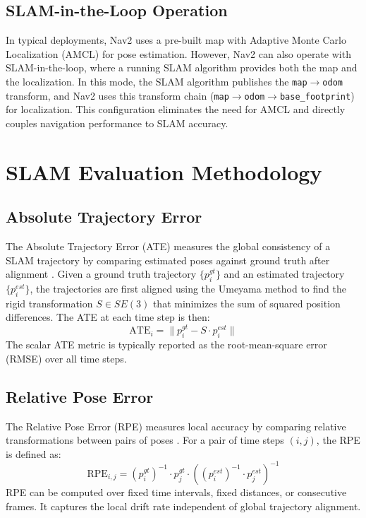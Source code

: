 \subsection{SLAM-in-the-Loop Operation}

In typical deployments, Nav2 uses a pre-built map with Adaptive Monte Carlo Localization (AMCL) for pose estimation. However, Nav2 can also operate with SLAM-in-the-loop, where a running SLAM algorithm provides both the map and the localization. In this mode, the SLAM algorithm publishes the \texttt{map}$\rightarrow$\texttt{odom} transform, and Nav2 uses this transform chain (\texttt{map}$\rightarrow$\texttt{odom}$\rightarrow$\texttt{base\_footprint}) for localization. This configuration eliminates the need for AMCL and directly couples navigation performance to SLAM accuracy.

\section{SLAM Evaluation Methodology}

\subsection{Absolute Trajectory Error}

The Absolute Trajectory Error (ATE) measures the global consistency of a SLAM trajectory by comparing estimated poses against ground truth after alignment \citep{sturm2012benchmark}. Given a ground truth trajectory $\{p_i^{gt}\}$ and an estimated trajectory $\{p_i^{est}\}$, the trajectories are first aligned using the Umeyama method \citep{umeyama1991} to find the rigid transformation $S \in SE(3)$ that minimizes the sum of squared position differences. The ATE at each time step is then:
\begin{equation}
\text{ATE}_i = \| p_i^{gt} - S \cdot p_i^{est} \|
\end{equation}
The scalar ATE metric is typically reported as the root-mean-square error (RMSE) over all time steps.

\subsection{Relative Pose Error}

The Relative Pose Error (RPE) measures local accuracy by comparing relative transformations between pairs of poses \citep{sturm2012benchmark, zhang2018tutorial}. For a pair of time steps $(i, j)$, the RPE is defined as:
\begin{equation}
\text{RPE}_{i,j} = (p_i^{gt})^{-1} \cdot p_j^{gt} \cdot \left( (p_i^{est})^{-1} \cdot p_j^{est} \right)^{-1}
\end{equation}
RPE can be computed over fixed time intervals, fixed distances, or consecutive frames. It captures the local drift rate independent of global trajectory alignment.

